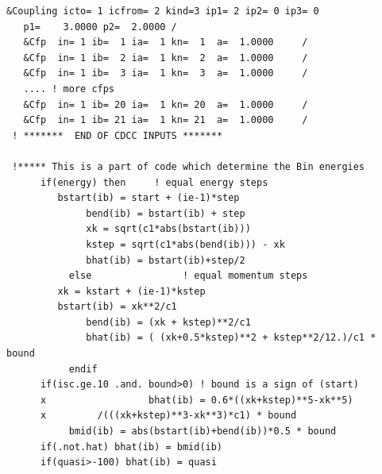\documentclass[11pt]{book}
\begin{document}
\begin{small}
\begin{lstlisting}[frame=single]
 &Coupling icto= 1 icfrom= 2 kind=3 ip1= 2 ip2= 0 ip3= 0                        
   p1=    3.0000 p2=  2.0000 /                                                  
   &Cfp  in= 1 ib=  1 ia=  1 kn=  1  a=  1.0000     /                           
   &Cfp  in= 1 ib=  2 ia=  1 kn=  2  a=  1.0000     /                           
   &Cfp  in= 1 ib=  3 ia=  1 kn=  3  a=  1.0000     /                           
   .... ! more cfps
   &Cfp  in= 1 ib= 20 ia=  1 kn= 20  a=  1.0000     /                           
   &Cfp  in= 1 ib= 21 ia=  1 kn= 21  a=  1.0000     /                           
 ! *******  END OF CDCC INPUTS *******  
 
 !***** This is a part of code which determine the Bin energies
 	  if(energy) then     ! equal energy steps
 	     bstart(ib) = start + (ie-1)*step
              bend(ib) = bstart(ib) + step
              xk = sqrt(c1*abs(bstart(ib)))
              kstep = sqrt(c1*abs(bend(ib))) - xk
              bhat(ib) = bstart(ib)+step/2
           else                ! equal momentum steps
 	     xk = kstart + (ie-1)*kstep
 	     bstart(ib) = xk**2/c1
              bend(ib) = (xk + kstep)**2/c1
              bhat(ib) = ( (xk+0.5*kstep)**2 + kstep**2/12.)/c1 * bound
           endif
 	  if(isc.ge.10 .and. bound>0) ! bound is a sign of (start)
      x                  bhat(ib) = 0.6*((xk+kstep)**5-xk**5)
      x			/(((xk+kstep)**3-xk**3)*c1) * bound
           bmid(ib) = abs(bstart(ib)+bend(ib))*0.5 * bound
 	  if(.not.hat) bhat(ib) = bmid(ib)
 	  if(quasi>-100) bhat(ib) = quasi                                        
\end{lstlisting}
\end{small} 
\end{document}

